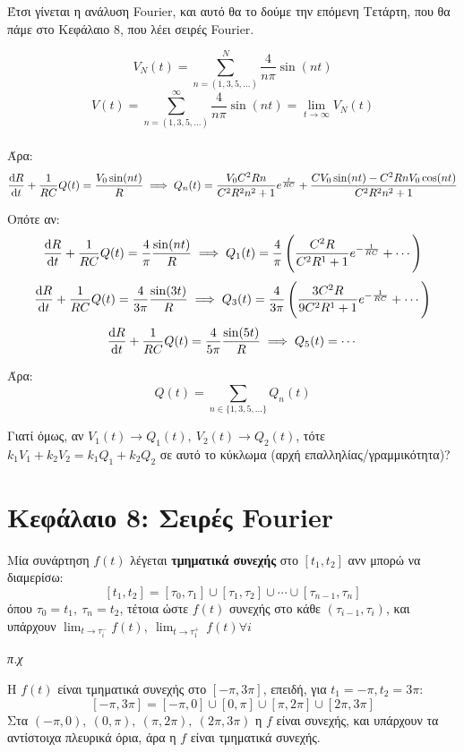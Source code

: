 \documentclass[11pt,a4paper,titlepage,draft]{article}
\begin{document}
Έτσι γίνεται η ανάλυση \textlatin{Fourier}, και αυτό θα το δούμε την επόμενη Τετάρτη, που θα πάμε στο Κεφάλαιο 8, που λέει σειρές \textlatin{Fourier}.

\[
V_N(t) = \sum _{n = (1,3,5,\dots)}^N \frac{4}{n \pi} \sin (n t)
\]
\[
V(t) = \sum _{n = (1,3,5,\dots)}^\infty \frac{4}{n \pi} \sin (n t) = \lim_{t \to \infty} V_N(t)
\]

\paragraph{}
Άρα:
\[
 \frac{\dif R}{\dif t}  + \frac{1}{RC}Q(t) = \frac{V_0 \sin (nt)}{R} \implies
 Q_n(t) = \frac{V_0C^2Rn}{C^2R^2n^2+1}e^{\frac{t}{RC}} + \frac{CV_0\sin (nt) - C^2RnV_0 \cos (nt)}{C^2R^2n^2+1}
\]

Οπότε αν:
\[
 \frac{\dif R}{\dif t}  + \frac{1}{RC}Q(t) = \frac{4}{\pi} \frac{\sin (nt)}{R} \implies
 Q_1(t) = \frac{4}{\pi} \left( \frac{C^2R}{C^2R^1+1} e^{-\frac{1}{RC}}+ \cdots \right)
\]
\[
 \frac{\dif R}{\dif t}  + \frac{1}{RC}Q(t) = \frac{4}{3\pi} \frac{\sin (3t)}{R} \implies
 Q_3(t) = \frac{4}{3\pi} \left( \frac{3C^2R}{9C^2R^1+1} e^{-\frac{1}{RC}}+ \cdots \right)
\]
\[
 \frac{\dif R}{\dif t}  + \frac{1}{RC}Q(t) = \frac{4}{5\pi} \frac{\sin (5t)}{R} \implies
 Q_5(t) = \cdots
\]

Άρα:
\[
Q(t) = \sum_{n \in \lbrace1,3,5,\dots\rbrace}Q_n(t)
\]

Γιατί όμως, αν \(V_1(t) \rightarrow Q_1(t), \ V_2(t) \rightarrow Q_2(t)\), τότε \(k_1V_1+k_2V_2 = k_1Q_1 +k_2Q_2\) σε αυτό το κύκλωμα (αρχή επαλληλίας/γραμμικότητα)?


\section{Κεφάλαιο 8: Σειρές Fourier}

\begin{defn*}{}
Μία συνάρτηση \(f(t)\) λέγεται \textbf{τμηματικά συνεχής} στο \([t_1,t_2]\) ανν μπορώ να διαμερίσω:
\[ [t_1,t_2] = [\tau_0,\tau_1] \cup [\tau_1,\tau_2] \cup \cdots \cup [\tau_{n-1},\tau_n] \]
όπου \(\tau_0 = t_1,\ \tau_n = t_2\), τέτοια ώστε \(f(t)\) συνεχής στο κάθε \((\tau_{i-1},\tau_i)\), και υπάρχουν \(\lim_{t \to \tau_i^-} f(t),\ \lim_{t \to \tau_1^+}\ f(t) \forall i\)
\end{defn*}

\textit{π.χ}

Η \(f(t)\) είναι τμηματικά συνεχής στο \([-\pi,3\pi]\), επειδή, για \(t_1=-\pi,t_2=3\pi\):
\[
[-\pi,3\pi] = [-\pi,0] \cup [0,\pi] \cup [\pi,2\pi] \cup [2\pi,3\pi]
\]
Στα \( (-\pi,0),\ (0,\pi) ,\   (\pi,2\pi) ,\   (2\pi,3\pi)\) η \(f\) είναι συνεχής, και υπάρχουν τα αντίστοιχα πλευρικά όρια, %
άρα η \(f\) είναι τμηματικά συνεχής.
\end{document}
